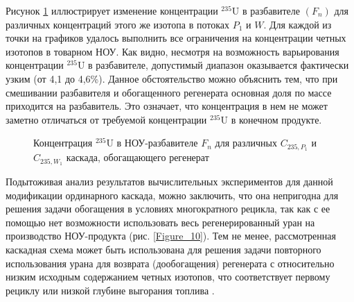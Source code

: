 



Рисунок \ref{fig3__7} иллюстрирует изменение концентрации $^{235}$U в разбавителе $(F_n)$ для различных концентраций этого же изотопа в потоках $P_1$ и $W$. Для каждой из точки на графиков удалось выполнить все ограничения на концентрации четных изотопов в товарном НОУ. Как видно, несмотря на возможность варьирования концентрации $^{235}$U в разбавителе, допустимый диапазон оказывается фактически узким (от 4,1 до 4,6\%). Данное обстоятельство можно объяснить тем, что при смешивании разбавителя и обогащенного регенерата основная доля по массе приходится на разбавитель. Это означает, что концентрация в нем не может заметно отличаться от требуемой концентрации $^{235}$U в конечном продукте.   

\begin{figure}[ht]
  \caption{Концентрация $^{235}$U в НОУ-разбавителе $F_n$ для различных $C_{235, P_1}$ и $C_{235, W_1}$ каскада, обогащающего регенерат}\label{fig3__7}
\end{figure}

Подытоживая анализ результатов вычислительных экспериментов для данной модификации ординарного каскада, можно заключить, что она непригодна для решения задачи обогащения в условиях многократного рецикла, так как с ее помощью нет возможности использовать весь регенерированный уран на производство НОУ-продукта (рис. \ref{Figure_10}). Тем не менее, рассмотренная каскадная схема может быть использована для решения задачи повторного использования урана для возврата (дообогащения) регенерата с относительно низким исходным содержанием четных изотопов, что соответствует первому рециклу или низкой глубине выгорания топлива \cite{smirnovKaskadnyeShemyZadachah2012}.


